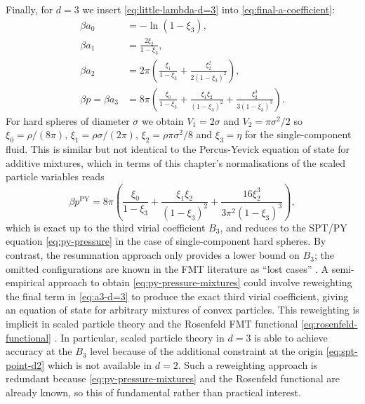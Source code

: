 \documentclass[11pt,twoside]{report}
\begin{document}
Finally, for $d=3$ we insert \eqref{eq:little-lambda-d=3} into \eqref{eq:final-a-coefficient}:
\begin{subequations}
  \begin{align}
    \beta a_0 &= -\ln{(1 - \xi_3)},
    \\
    \beta a_1 &= \frac{2 \xi_2}{1-\xi_3},
    \\
    \beta a_2 &=
    2 \pi
    \left(
    \frac{\xi_1}{1-\xi_3}
    + \frac{\xi_2^2}{2(1-\xi_3)^2}
    \right),
    \\
    \beta p =
    \beta a_3 &=
    8 \pi
    \left(
    \frac{\xi_0}{1-\xi_3}
    + \frac{\xi_1 \xi_2}{(1-\xi_3)^2}
    + \frac{\xi_2^3}{3 (1-\xi_3)^3}
    \right).
    \label{eq:a3-d=3}
  \end{align}
\end{subequations}
For hard spheres of diameter $\sigma$ we obtain $V_1 = 2\sigma$ and $V_2 = \pi \sigma^2 / 2$ so $\xi_0 = \rho / (8\pi)$, $\xi_1 = \rho \sigma / (2\pi)$, $\xi_2 = \rho \pi \sigma^2 / 8$ and $\xi_3 = \eta$ for the single-component fluid.
This is similar but not identical to the Percus-Yevick equation of state%
for additive mixtures, which in terms of this chapter's normalisations of the scaled particle variables reads \cite{Santos2016}
\begin{equation}\label{eq:py-pressure-mixtures}
  \beta p^\mathrm{PY} =
  8 \pi
  \left(
  \frac{\xi_0}{1-\xi_3}
  + \frac{\xi_1 \xi_2}{(1-\xi_3)^2}
  + \frac{16 \xi_2^3}{3 \pi^2 (1-\xi_3)^3}
  \right),
\end{equation}
which is exact up to the third virial coefficient $B_3$, and reduces to the SPT/PY equation \eqref{eq:py-pressure} in the case of single-component hard spheres.
By contrast, the resummation approach only provides a lower bound on $B_3$; the omitted configurations are known in the FMT literature as ``lost cases'' \cite{TarazonaPRE1997}.
A semi-empirical approach to obtain \eqref{eq:py-pressure-mixtures} could involve reweighting the final term in \eqref{eq:a3-d=3} to produce the exact third virial coefficient, giving an equation of state for arbitrary mixtures of convex particles.
This reweighting is implicit in scaled particle theory and the Rosenfeld FMT functional \eqref{eq:rosenfeld-functional} \cite{TarazonaPRE1997,MarechalPRE2014}.
In particular, scaled particle theory in $d=3$ is able to achieve accuracy at the $B_3$ level because of the additional constraint at the origin \eqref{eq:spt-point-d2} which is not available in $d=2$.
Such a reweighting approach is redundant because \eqref{eq:py-pressure-mixtures} and the Rosenfeld functional are already known, so this of fundamental rather than practical interest.
\end{document}
